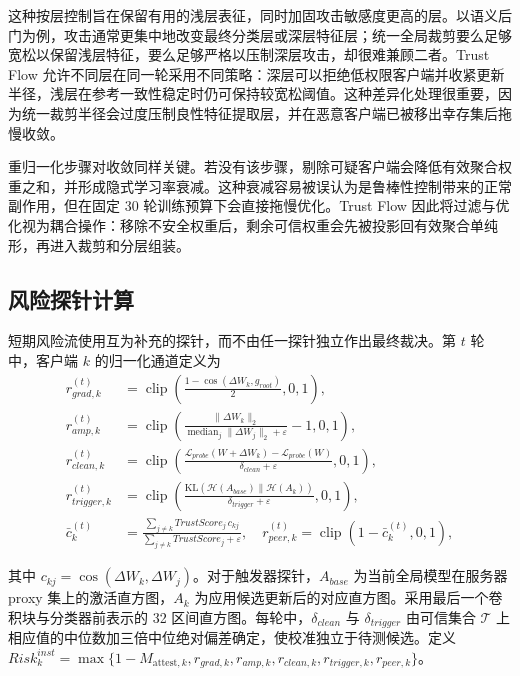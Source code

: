 \documentclass[10pt,a4paper,UTF8,fontset=fandol]{ctexart}
\begin{document}
这种按层控制旨在保留有用的浅层表征，同时加固攻击敏感度更高的层。以语义后门为例，攻击通常更集中地改变最终分类层或深层特征层；统一全局裁剪要么足够宽松以保留浅层特征，要么足够严格以压制深层攻击，却很难兼顾二者。Trust Flow 允许不同层在同一轮采用不同策略：深层可以拒绝低权限客户端并收紧更新半径，浅层在参考一致性稳定时仍可保持较宽松阈值。这种差异化处理很重要，因为统一裁剪半径会过度压制良性特征提取层，并在恶意客户端已被移出幸存集后拖慢收敛。

重归一化步骤对收敛同样关键。若没有该步骤，剔除可疑客户端会降低有效聚合权重之和，并形成隐式学习率衰减。这种衰减容易被误认为是鲁棒性控制带来的正常副作用，但在固定 30 轮训练预算下会直接拖慢优化。Trust Flow 因此将过滤与优化视为耦合操作：移除不安全权重后，剩余可信权重会先被投影回有效聚合单纯形，再进入裁剪和分层组装。

\subsection{风险探针计算}

短期风险流使用互为补充的探针，而不由任一探针独立作出最终裁决。第 $t$ 轮中，客户端 $k$ 的归一化通道定义为
\begin{align}
 r_{grad,k}^{(t)}&=\operatorname{clip}\!\left(\frac{1-\cos(\Delta W_k,g_{root})}{2},0,1\right),\\
 r_{amp,k}^{(t)}&=\operatorname{clip}\!\left(\frac{\|\Delta W_k\|_2}{\operatorname{median}_j\|\Delta W_j\|_2+\varepsilon}-1,0,1\right),\\
 r_{clean,k}^{(t)}&=\operatorname{clip}\!\left(\frac{\mathcal{L}_{probe}(W+\Delta W_k)-\mathcal{L}_{probe}(W)}{\delta_{clean}+\varepsilon},0,1\right),\\
 r_{trigger,k}^{(t)}&=\operatorname{clip}\!\left(\frac{\mathrm{KL}(\mathcal{H}(A_{base})\|\mathcal{H}(A_k))}{\delta_{trigger}+\varepsilon},0,1\right),\\
 \bar c_k^{(t)}&=\frac{\sum_{j\ne k}TrustScore_j\,c_{kj}}{\sum_{j\ne k}TrustScore_j+\varepsilon},\quad
 r_{peer,k}^{(t)}=\operatorname{clip}(1-\bar c_k^{(t)},0,1),
\end{align}

其中 $c_{kj}=\cos(\Delta W_k,\Delta W_j)$。对于触发器探针，$A_{base}$ 为当前全局模型在服务器 proxy 集上的激活直方图，$A_k$ 为应用候选更新后的对应直方图。采用最后一个卷积块与分类器前表示的 32 区间直方图。每轮中，$\delta_{clean}$ 与 $\delta_{trigger}$ 由可信集合 $\mathcal{T}$ 上相应值的中位数加三倍中位绝对偏差确定，使校准独立于待测候选。定义 $Risk_k^{inst}=\max\{1-M_{\text{attest},k},r_{grad,k},r_{amp,k},r_{clean,k},r_{trigger,k},r_{peer,k}\}$。
\end{document}
